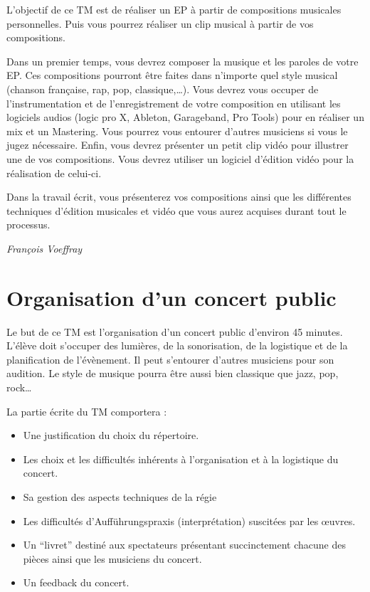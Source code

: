\documentclass[
  10pt,
  french,
  a5paper,
  openany]{book}
\providecommand{\tightlist}{%
  \setlength{\itemsep}{0pt}\setlength{\parskip}{0pt}}
\newenvironment{signature}{\begin{flushright}}{\end{flushright}}
\begin{document}
L'objectif de ce TM est de réaliser un EP à partir de compositions musicales personnelles. Puis vous pourrez réaliser un clip musical à partir de vos compositions.

Dans un premier temps, vous devrez composer la musique et les paroles de votre EP. Ces compositions pourront être faites dans n'importe quel style musical (chanson française, rap, pop, classique,\ldots). Vous devrez vous occuper de l'instrumentation et de l'enregistrement de votre composition en utilisant les logiciels audios (logic pro X, Ableton, Garageband, Pro Tools) pour en réaliser un mix et un Mastering. Vous pourrez vous entourer d'autres musiciens si vous le jugez nécessaire. Enfin, vous devrez présenter un petit clip vidéo pour illustrer une de vos compositions. Vous devrez utiliser un logiciel d'édition vidéo pour la réalisation de celui-ci.

Dans la travail écrit, vous présenterez vos compositions ainsi que les différentes techniques d'édition musicales et vidéo que vous aurez acquises durant tout le processus.

\begin{signature}
\emph{François Voeffray}

\end{signature}

\hypertarget{organisation-dun-concert-public}{%
\chapter{Organisation d'un concert public}\label{organisation-dun-concert-public}}

Le but de ce TM est l'organisation d'un concert public d'environ 45 minutes. L'élève doit s'occuper des lumières, de la sonorisation, de la logistique et de la planification de l'évènement. Il peut s'entourer d'autres musiciens pour son audition. Le style de musique pourra être aussi bien classique que jazz, pop, rock\ldots{}

La partie écrite du TM comportera :

\begin{itemize}
\tightlist
\item
  Une justification du choix du répertoire.
\item
  Les choix et les difficultés inhérents à l'organisation et à la logistique du concert.
\item
  Sa gestion des aspects techniques de la régie
\item
  Les difficultés d'Aufführungspraxis (interprétation) suscitées par les œuvres.
\item
  Un ``livret'' destiné aux spectateurs présentant succinctement chacune des pièces ainsi que les musiciens du concert.
\item
  Un feedback du concert.
\end{itemize}
\end{document}
